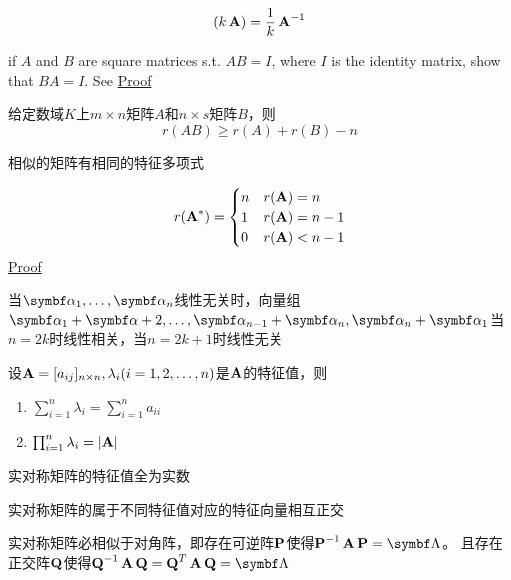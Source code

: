 \documentclass{article}
\begin{document}
\begin{equation*}
(k\operatorname{\textbf{A}})=\frac{1}{k}\operatorname{\textbf{A}}^{-1}
\end{equation*}

if \(A\) and \(B\) are square matrices s.t. \(AB=I\), where \(I\) is the
identity matrix, show that \(BA=I\). See \href{https://math.stackexchange.com/questions/3852/if-ab-i-then-ba-i}{Proof}


给定数域\(K\)上\(m\times n\)矩阵\(A\)和\(n\times s\)矩阵\(B\)，则
\begin{equation*}
r(AB)\ge r(A)+r(B)-n
\end{equation*}

相似的矩阵有相同的特征多项式

\begin{equation*}
r(\operatorname{\textbf{A}}^*)=
\begin{cases}
n&r(\operatorname{\textbf{A}})=n\\
1&r(\operatorname{\textbf{A}})=n-1\\
0&r(\operatorname{\textbf{A}})<n-1
\end{cases}
\end{equation*}
\href{https://math.stackexchange.com/questions/410402/for-given-n-times-n-matrix-a-singular-matrix-prove-that-operatornamerank/410415\#410415}{Proof}

当\(\balpha_1,\dots,\balpha_n\)线性无关时，向量组
\(\balpha_1+\balpha+2,\dots,\balpha_{n-1}+\balpha_n, \balpha_n+\balpha_1\)当
\(n=2k\)时线性相关，当\(n=2k+1\)时线性无关

设\(\operatorname{\textbf{A}}=[a_{ij}]_{n\times n},\lambda_i(i=1,2,\dots,n)\)是\(\operatorname{\textbf{A}}\)的特征值，则
\begin{enumerate}
\item \(\sum_{i=1}^n\lambda_i=\sum_{i=1}^na_{ii}\)
\item \(\prod_{i=1}^n\lambda_i=\abs{\bA}\)
\end{enumerate}


\begin{theorem}[]
实对称矩阵的特征值全为实数
\end{theorem}

\begin{theorem}[]
实对称矩阵的属于不同特征值对应的特征向量相互正交
\end{theorem}

\begin{theorem}[]
实对称矩阵必相似于对角阵，即存在可逆阵\(\operatorname{\textbf{P}}\)使得\(\bP^{-1}\bA\bP=\bLambda\)。
且存在正交阵\(\operatorname{\textbf{Q}}\)使得\(\bQ^{-1}\bA\bQ=\bQ^T\bA\bQ=\bLambda\)
\end{theorem}
\end{document}
